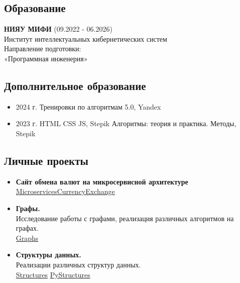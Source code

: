 \documentclass[14pt]{extarticle}
\begin{document}
\begin{minipage}{0.6\textwidth} %
      \subsection*{Образование}
      \textbf{НИЯУ МИФИ} (09.2022 - 06.2026) \\
      Институт интеллектуальных кибернетических систем \\
      Направление подготовки:\\ «Программная инженерия»

      \subsection*{Дополнительное образование}
      \begin{itemize}
            \item 2024 г.
                  \subitem Тренировки по алгоритмам 5.0, Yandex
            \item 2023 г.
                  \subitem HTML CSS JS, Stepik
                  \subitem Алгоритмы: теория и практика. Методы, Stepik
      \end{itemize}
      \subsection*{Личные проекты}
      \begin{itemize}
            \item \textbf{Сайт обмена валют на микросервисной архитектуре} \\
                  \href{https://github.com/MichaelKolesnikov/MicroservicesCurrencyExchange}{MicroservicesCurrencyExchange}

            \item \textbf{Графы.} \\
                  Исследование работы с графами, реализация различных алгоритмов на графах. \\
                  \href{https://github.com/MichaelKolesnikov/Graphs}{Graphs}

            \item \textbf{Структуры данных.} \\
                  Реализации различных структур данных. \\
                  \href{https://github.com/MichaelKolesnikov/Structures}{Structures} \quad
                  \href{https://github.com/MichaelKolesnikov/PyStructures}{PyStructures}


\end{itemize}
\end{minipage}
\end{document}
